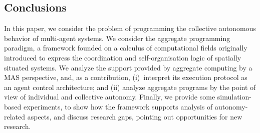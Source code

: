 \documentclass[jsan,article,accept,moreauthors,pdftex]{Definitions/mdpi}
\begin{document}
\begin{paracol}{2}
\section{Conclusions} %
\label{s:conc}

In this paper, we consider the problem
 of programming the collective autonomous behavior
 of multi-agent systems.
%
We consider the aggregate programming paradigm, 
 a framework
 founded on a calculus of computational fields
 originally introduced 
 to express the coordination 
 and self-organisation logic of spatially situated systems.
%
We analyze the support provided by aggregate computing
 by a MAS perspective,
 and, as a contribution, 
 (i)~interpret its execution protocol as an agent control architecture; and
 (ii) analyze aggregate programs by the point of view of individual and collective autonomy.
%
Finally, 
 we provide some simulation-based experiments,
 to show how the framework supports
 analysis of autonomy-related aspects,
 and discuss research gaps,
 pointing out opportunities for new research.



\end{paracol}
\end{document}
